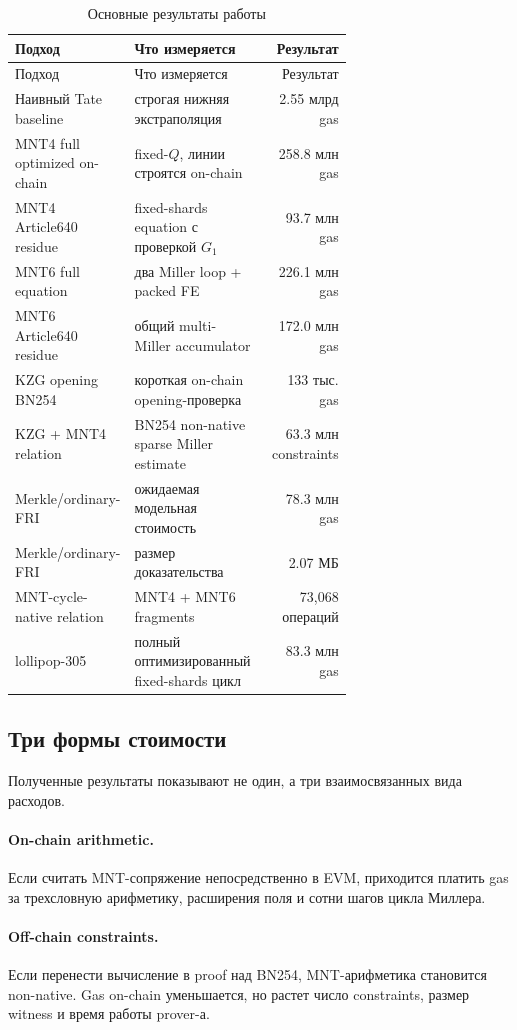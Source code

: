 \documentclass[12pt,a4paper]{article}
\begin{document}
\begin{longtable}{p{0.31\linewidth}p{0.36\linewidth}r}
\caption{Основные результаты работы}\\
\toprule
Подход & Что измеряется & Результат \\
\midrule
\endfirsthead
\toprule
Подход & Что измеряется & Результат \\
\midrule
\endhead
Наивный Tate baseline & строгая нижняя экстраполяция & 2.55 млрд gas \\
MNT4 full optimized on-chain & fixed-$Q$, линии строятся on-chain & 258.8 млн gas \\
MNT4 Article640 residue & fixed-shards equation с проверкой $G_1$ & 93.7 млн gas \\
MNT6 full equation & два Miller loop + packed FE & 226.1 млн gas \\
MNT6 Article640 residue & общий multi-Miller accumulator & 172.0 млн gas \\
KZG opening BN254 & короткая on-chain opening-проверка & 133 тыс. gas \\
KZG + MNT4 relation & BN254 non-native sparse Miller estimate & 63.3 млн constraints \\
Merkle/ordinary-FRI & ожидаемая модельная стоимость & 78.3 млн gas \\
Merkle/ordinary-FRI & размер доказательства & 2.07 МБ \\
MNT-cycle-native relation & MNT4 + MNT6 fragments & 73,068 операций \\
lollipop-305 & полный оптимизированный fixed-shards цикл & 83.3 млн gas \\
\bottomrule
\end{longtable}

\subsection{Три формы стоимости}

Полученные результаты показывают не один, а три взаимосвязанных вида расходов.

\paragraph{On-chain arithmetic.}
Если считать MNT-сопряжение непосредственно в EVM, приходится платить gas за
трехсловную арифметику, расширения поля и сотни шагов цикла Миллера.

\paragraph{Off-chain constraints.}
Если перенести вычисление в proof над BN254, MNT-арифметика становится
non-native. Gas on-chain уменьшается, но растет число constraints, размер
witness и время работы prover-а.
\end{document}
